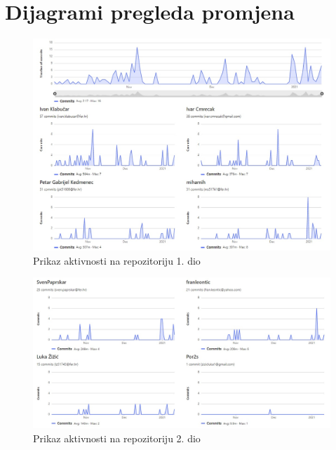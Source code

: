 \begin{longtabu}
			\end{longtabu}
					
					
		\eject
		\section*{Dijagrami pregleda promjena}
		
		\begin{figure}[H]
			\centerfloat
			\advance{}
			\includegraphics[scale=0.60]{slike/dijpregprom1.jpg} %
			\caption{Prikaz aktivnosti na repozitoriju 1. dio}
		\end{figure}
	
	\begin{figure}[H]
		\centerfloat
		\advance{}
		\includegraphics[scale=0.55]{slike/dijpregprom2.jpg} %
		\caption{Prikaz aktivnosti na repozitoriju 2. dio}
	\end{figure}
		
	